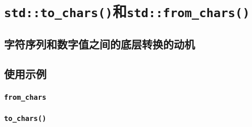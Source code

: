 \section{\texttt{std::to\_chars()}和\texttt{std::from\_chars()}}\label{ch31}

\subsection{字符序列和数字值之间的底层转换的动机}

\subsection{使用示例}

\subsubsection{\texttt{from\_chars}}\label{ch31.2.1}

\subsubsection{\texttt{to\_chars()}}\label{ch31.2.2}
